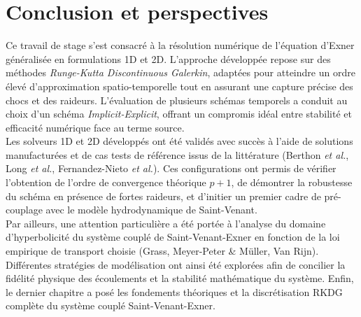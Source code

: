 \documentclass[11pt, a4paper, oneside]{report}
\begin{document}
\chapter*{Conclusion et perspectives}
\enlargethispage{1\baselineskip}

Ce travail de stage s'est consacré à la résolution numérique de l'équation d'Exner généralisée en formulations 1D et 2D. L'approche développée repose sur des méthodes \textit{Runge-Kutta Discontinuous Galerkin}, adaptées pour atteindre un ordre élevé d'approximation spatio-temporelle tout en assurant une capture précise des chocs et des raideurs. L'évaluation de plusieurs schémas temporels a conduit au choix d'un schéma \textit{Implicit-Explicit}, offrant un compromis idéal entre stabilité et efficacité numérique face au terme source. \\
Les solveurs 1D et 2D développés ont été validés avec succès à l'aide de solutions manufacturées et de cas tests de référence issus de la littérature (Berthon \textit{et al.}, Long \textit{et al.}, Fernandez-Nieto \textit{et al.}). Ces configurations ont permis de vérifier l'obtention de l'ordre de convergence théorique $p+1$, de démontrer la robustesse du schéma en présence de fortes raideurs, et d'initier un premier cadre de pré-couplage avec le modèle hydrodynamique de Saint-Venant. \\
Par ailleurs, une attention particulière a été portée à l'analyse du domaine d'hyperbolicité du système couplé de Saint-Venant-Exner en fonction de la loi empirique de transport choisie (Grass, Meyer-Peter \& Müller, Van Rijn). Différentes stratégies de modélisation ont ainsi été explorées afin de concilier la fidélité physique des écoulements et la stabilité mathématique du système. Enfin, le dernier chapitre a posé les fondements théoriques et la discrétisation RKDG complète du système couplé Saint-Venant-Exner. \\
\end{document}
